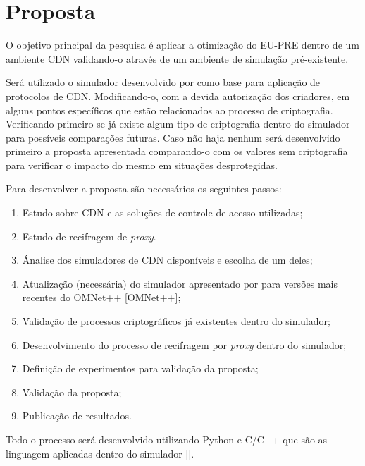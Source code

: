 \section{Proposta}
\label{proposta:metodologia}
O objetivo principal da pesquisa é aplicar a otimização do EU-PRE dentro de um ambiente CDN validando-o através de um ambiente de simulação pré-existente.

Será utilizado o simulador desenvolvido por \cite{stamos2010cdnsim} como base para aplicação de protocolos de CDN. Modificando-o, com a devida autorização dos criadores, em alguns pontos específicos que estão relacionados ao processo de criptografia. Verificando primeiro se já existe algum tipo de criptografia dentro do simulador para possíveis comparações futuras.
Caso não haja nenhum será desenvolvido primeiro a proposta apresentada comparando-o com os valores sem criptografia para verificar o impacto do mesmo em situações desprotegidas.

Para desenvolver a proposta são necessários os seguintes passos:
\begin{enumerate}

    \item \label{proposta:EstudoCDN} Estudo sobre CDN e as soluções de controle de acesso utilizadas;
    \item \label{proposta:EstudoRecifragem} Estudo de recifragem de \emph{proxy}.
    \item \label{proposta:AnaliseSim} Ánalise dos simuladores de CDN disponíveis e escolha de um deles;
    \item \label{proposta:Atualizacao} Atualização (necessária) do simulador apresentado por \cite{stamos2010cdnsim} para versões mais recentes do OMNet++ [OMNet++];
    \item \label{proposta:ValidacaoProcesso} Validação de processos criptográficos já existentes dentro do simulador;
    \item \label{proposta:Desenvolvimento} Desenvolvimento do processo de recifragem por \emph{proxy} dentro do simulador;
    \item \label{proposta:DefExperimentos} Definição de experimentos para validação da proposta;
    \item \label{proposta:ValidacaoProposta} Validação da proposta;
    \item \label{proposta:Publicacao} Publicação de resultados.

\end{enumerate}



Todo o processo será desenvolvido utilizando Python e C/C++ que são as linguagem aplicadas dentro do simulador [\cite{stamos2010cdnsim}].